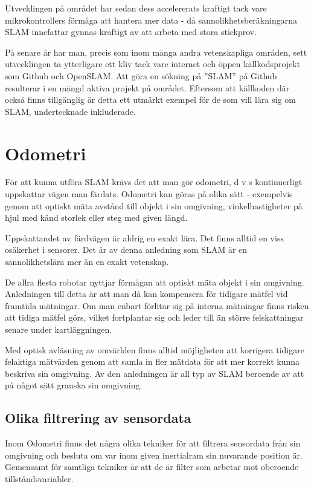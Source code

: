 \documentclass[a4paper,12pt,fleqn]{article}
\begin{document}
Utvecklingen på området har sedan dess accelererats kraftigt tack vare
mikrokontrollers förmåga att hantera mer data - då
sannolikhetsberäkningarna SLAM innefattar gynnas kraftigt av att arbeta
med stora stickprov.

På senare år har man, precis som inom många andra vetenskapliga områden, sett utvecklingen ta ytterligare ett kliv tack vare internet och öppen källkodsprojekt som Github och OpenSLAM. Att göra en sökning på ''SLAM'' på Github resulterar i en mängd aktiva projekt på området. Eftersom att källkoden där också finns tillgänglig är detta ett utmärkt exempel för de som vill lära sig om SLAM, undertecknade inkluderade. 

\section{Odometri}

För att kunna utföra SLAM krävs det att man gör odometri, d v s kontinuerligt uppskattar vägen man färdats. Odometri kan göras på olika sätt - exempelvis genom att optiskt mäta avstånd till objekt i sin omgivning, vinkelhastigheter på hjul med känd storlek eller steg med given längd. 

Uppskattandet av färdvägen är aldrig en exakt lära. Det finns alltid en viss osäkerhet i sensorer. Det är av denna anledning som SLAM är en sannolikhetslära mer än en exakt vetenskap. 

De allra flesta robotar nyttjar förmågan att optiskt mäta objekt i sin omgivning. Anledningen till detta är att man då kan kompensera för tidigare mätfel vid framtida mätningar. Om man enbart förlitar sig på interna mätningar finns risken att tidiga mätfel görs, vilket fortplantar sig och leder till än större felskattningar senare under kartläggningen. 

Med optisk avläsning av omvärlden finns alltid möjligheten att korrigera tidigare felaktiga mätvärden genom att samla in fler mätdata för att mer korrekt kunna beskriva sin omgivning. Av den anledningen är all typ av SLAM beroende av att på något sätt granska sin omgivning. 

\subsection{Olika filtrering av sensordata}

Inom Odometri finns det några olika tekniker för att filtrera sensordata från sin omgivning och besluta om var inom given inertialram sin nuvarande position är. Gemensamt för samtliga tekniker är att de är filter som arbetar mot oberoende tillståndsvariabler. 
\end{document}
